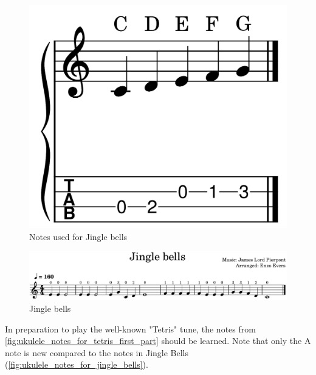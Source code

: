 \begin{figure}[h]
	\centering
	\includegraphics[height=0.12\textheight]{../../MuseScore/Ukulele/UkuleleNotesInJingleBells.png}
	\caption{Notes used for Jingle bells}
	\label{fig:ukulele_notes_for_jingle_bells}
\end{figure}

\begin{figure}[h]
	\centering
	\includegraphics[width=\textwidth]{../../MuseScore/Ukulele/UkuleleJingleBells.png}
	\caption{Jingle bells}
	\label{fig:ukulele_jingle_bells}
\end{figure}

\newpage

In preparation to play the well-known "Tetris" tune, the notes from \autoref{fig:ukulele_notes_for_tetris_first_part} should be learned. Note that only the A note is new compared to the notes in Jingle Bells (\autoref{fig:ukulele_notes_for_jingle_bells}).

